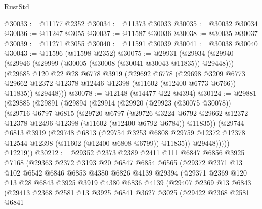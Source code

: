 \begin{lexlean}{RustStd}
\begin{coremodule}
@30033 := @11177 @2352
@30034 := @11373 @30033
@30035 := @30032 @30034
@30036 := @11247 @3055
@30037 := @11587 @30036
@30038 := @30035 @30037
@30039 := @11271 @3055
@30040 := @11591 @30039
@30041 := @30038 @30040
@30043 := @11596 (@11598 @2352)
@30075 := @29931
    (@29934
      (@29940
        (@29946 (@29999 (@30005 (@30008 (@30041 @30043 @11835)) @29448)))
        (@29685
          @120
          @22
          @28
          @6778
          @3919
          (@29692
            @6778
            (@29698
              @3209
              @6773
              @29662
              @12372
              @12378
              @12446
              @12398
              (@11602 (@12400 @6773 @6766))
              @11835))
          @29448)))
@30078 := @12148 (@14477 @22 @4394)
@30124 := @29881
    (@29885
      (@29891
        (@29894
          (@29914
            (@29920
              (@29923 (@30075 @30078))
              (@29716
                @6797
                @6815
                (@29720
                  @6797
                  (@29726
                    @3224
                    @6792
                    @29662
                    @12372
                    @12378
                    @12496
                    @12398
                    (@11602 (@12400 @6792 @6784))
                    @11835))
                (@29744
                  @6813
                  @3919
                  (@29748
                    @6813
                    (@29754
                      @3253
                      @6808
                      @29759
                      @12372
                      @12378
                      @12544
                      @12398
                      (@11602 (@12400 @6808 @6799))
                      @11835))
                  @29448)))))
        @12219))
@30212 := @29352
    @2373
    @2389
    @2411
    @111
    @6847
    @6856
    @3925
    @7168
    (@29363
      @2372
      @3193
      @20
      @6847
      @6854
      @6565
      (@29372
        @2371
        @13
        @102
        @6542
        @6846
        @6853
        @4380
        @6826
        @4139
        @29394
        (@29371
          @2369
          @120
          @13
          @28
          @6843
          @3925
          @3919
          @4380
          @6836
          @4139
          (@29407
            @2369
            @13
            @6843
            (@29413
              @2368
              @2581
              @13
              @3925
              @6841
              @3627
              @3025
              (@29422
                @2368
                @2581
                @6841

\end{coremodule}
\end{lexlean}
